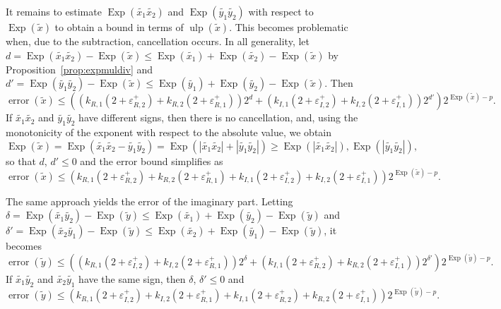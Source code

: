 \documentclass [12pt]{article}
\newcommand {\appro}[1]{\widetilde {#1}}
\newcommand {\Ulp}{{\operatorname {ulp}}}
\DeclareMathOperator{\Exp}{\operatorname {Exp}}
\newcommand{\error}{\operatorname {error}}
\renewcommand {\epsilon}{\varepsilon}
\renewcommand {\leq}{\leqslant}
\renewcommand {\geq}{\geqslant}
\begin{document}
It remains to estimate $\Exp (\appro {x_1} \appro {x_2})$ and
$\Exp (\appro {y_1} \appro {y_2})$ with respect to $\Exp (\appro x)$ to obtain
a bound in terms of $\Ulp (\appro x)$. This becomes problematic when, due
to the subtraction, cancellation occurs. In all generality, let
$d = \Exp (\appro {x_1} \appro {x_2}) - \Exp (\appro x)
\leq \Exp (\appro {x_1}) + \Exp (\appro {x_2}) - \Exp (\appro x)$
by Proposition~\ref {prop:expmuldiv} and
$d' = \Exp( \appro {y_1} \appro {y_2}) - \Exp (\appro x)
\leq \Exp (\appro {y_1}) + \Exp (\appro {y_2}) - \Exp (\appro x)$.
Then
\begin {equation}
\label {eq:propmulre}
\error( \appro x) \leq \left(
   \left( k_{R, 1} (2 + \epsilon_{R, 2}^+)
   + k_{R, 2} (2 + \epsilon_{R, 1}^+) \right) 2^d
   + \left( k_{I, 1} (2 + \epsilon_{I, 2}^+)
   + k_{I, 2} (2 + \epsilon_{I, 1}^+) \right) 2^{d'}
   \right) 2^{\Exp (\appro x) - p}.
\end {equation}
If $\appro {x_1} \appro {x_2}$ and $\appro {y_1} \appro {y_2}$ have different
signs, then there is no cancellation, and, using the monotonicity of the
exponent with respect to the absolute value, we obtain
\[
\Exp (\appro x) = \Exp (\appro {x_1} \appro {x_2} - \appro {y_1} \appro {y_2})
= \Exp (|\appro {x_1} \appro {x_2}| + |\appro {y_1} \appro {y_2}|)
\geq \Exp (|\appro {x_1} \appro {x_2}|), \Exp (|\appro {y_1} \appro {y_2}|),
\]
so that $d$, $d' \leq 0$ and the error bound simplifies as
\[
\error( \appro x) \leq \left(
   k_{R, 1} (2 + \epsilon_{R, 2}^+)
   + k_{R, 2} (2 + \epsilon_{R, 1}^+)
   + k_{I, 1} (2 + \epsilon_{I, 2}^+)
   + k_{I, 2} (2 + \epsilon_{I, 1}^+)
   \right) 2^{\Exp (\appro x) - p}.
\]

The same approach yields the error of the imaginary part. Letting
$\delta = \Exp (\appro {x_1} \appro {y_2}) - \Exp (\appro y)
\leq \Exp( \appro {x_1}) + \Exp (\appro {y_2}) - \Exp (\appro y)$ and
$\delta' = \Exp (\appro {x_2} \appro {y_1}) - \Exp (\appro {y})
\leq \Exp (\appro {x_2}) + \Exp (\appro {y_1}) - \Exp (\appro y)$,
it becomes
\begin {equation}
\label {eq:propmulim}
\error( \appro y) \leq \left(
   \left( k_{R, 1} (2 + \epsilon_{I, 2}^+)
   + k_{I, 2} (2 + \epsilon_{R, 1}^+) \right) 2^{\delta}
   + \left( k_{I, 1} (2 + \epsilon_{R, 2}^+)
   + k_{R, 2} (2 + \epsilon_{I, 1}^+) \right) 2^{\delta'}
   \right) 2^{\Exp (\appro y) - p}.
\end {equation}
If $\appro {x_1} \appro {y_2}$ and $\appro {x_2} \appro {y_1}$ have
the same sign, then $\delta$, $\delta' \leq 0$ and
\[
\error( \appro y) \leq \left(
   k_{R, 1} (2 + \epsilon_{I, 2}^+)
   + k_{I, 2} (2 + \epsilon_{R, 1}^+)
   + k_{I, 1} (2 + \epsilon_{R, 2}^+)
   + k_{R, 2} (2 + \epsilon_{I, 1}^+)
   \right) 2^{\Exp (\appro y) - p}.
\]
\end{document}
